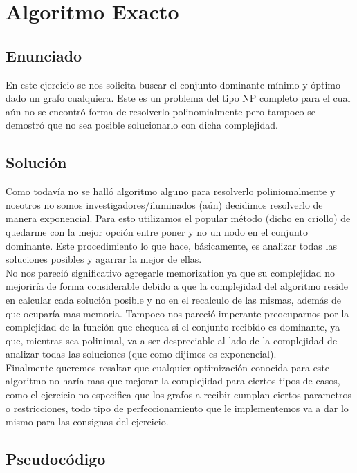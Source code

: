 \section{Algoritmo Exacto}

\subsection{Enunciado}
En este ejercicio se nos solicita buscar el conjunto dominante mínimo y óptimo dado un grafo cualquiera. Este es un problema del tipo NP completo 
para el cual aún no se encontró forma de resolverlo polinomialmente pero tampoco se demostró que no sea posible solucionarlo con dicha complejidad.

\subsection{Soluci\'on}
Como todavía no se halló algoritmo alguno para resolverlo poliniomalmente y nosotros no somos investigadores/iluminados (aún) decidimos resolverlo
de manera exponencial. Para esto utilizamos el popular método (dicho en criollo) de quedarme con la mejor opción entre poner y no un nodo en el 
conjunto dominante. Este procedimiento lo que hace, básicamente, es analizar todas las soluciones posibles y agarrar la mejor de ellas. \\
No nos pareció significativo agregarle memorization ya que su complejidad no mejoriría de forma considerable debido a que la complejidad del algoritmo reside en calcular cada solución posible y no en el recalculo de las mismas, además de que ocuparía mas memoria. Tampoco nos pareció imperante preocuparnos por la complejidad de la función que chequea si el conjunto recibido es dominante, ya que, mientras sea polinimal, va a ser despreciable al lado de la complejidad de analizar todas las soluciones (que como dijimos es exponencial). \\
Finalmente queremos resaltar que cualquier optimización conocida para este algoritmo no haría mas que mejorar la complejidad para ciertos tipos de casos, como el ejercicio no especifica que los grafos a recibir cumplan ciertos parametros o restricciones, todo tipo de perfeccionamiento que le implementemos va a dar lo mismo para las consignas del ejercicio.

\subsection{Pseudocódigo}

